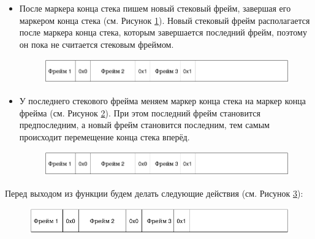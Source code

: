 \documentclass[times,specification,annotation]{itmo-student-thesis}
\begin{document}
\begin{itemize}
    \item После маркера конца стека пишем новый стековый фрейм, завершая его маркером конца стека (см. Рисунок \ref{stack-add-pic}). Новый стековый фрейм располагается после маркера конца стека, которым завершается последний фрейм, поэтому он пока не считается стековым фреймом. 
    
    \begin{figure}[H]
      \centering
      \label{stack-add-pic}
      \includegraphics[width=\linewidth]{4.png}
    \end{figure}

    
    \item У последнего стекового фрейма меняем маркер конца стека на маркер конца фрейма (см. Рисунок \ref{after-moving-forward}). При этом последний фрейм становится предпоследним, а новый фрейм становится последним, тем самым происходит перемещение конца стека вперёд.
    
     \begin{figure}[H]
      \centering
      \includegraphics[width=\linewidth]{5.png}
      \label{after-moving-forward}
    \end{figure}
\end{itemize}

\bigbreak
\bigbreak

Перед выходом из функции будем делать следующие действия (см. Рисунок \ref{before-return-pic}):

\begin{figure}[H]
  \centering
  \includegraphics[width=\linewidth]{5.png}
  \label{before-return-pic}
\end{figure}
\end{document}

